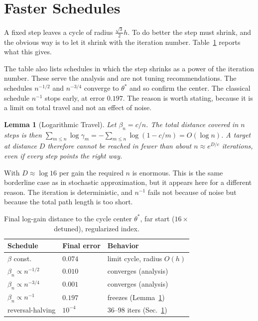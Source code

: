 \documentclass[letterpaper, 10pt, conference, twocolumn]{ieeeconf}
\newtheorem{lemma}{Lemma}
\begin{document}
\section{Faster Schedules}
\label{sec:accel}

A fixed step leaves a cycle of radius $\tfrac{\sqrt3}{2}h$. To do better the
step must shrink, and the obvious way is to let it shrink with the iteration
number. Table~\ref{tab:schedules} reports what this gives.

The table also lists schedules in which the step shrinks as a power of the
iteration number. These serve the analysis and are not tuning recommendations.
The schedules $n^{-1/2}$ and $n^{-3/4}$ converge to $\theta^*$ and so confirm
the center. The classical schedule $n^{-1}$ stops early, at error $0.197$. The
reason is worth stating, because it is a limit on total travel and not an
effect of noise.

\begin{lemma}[Logarithmic Travel]
\label{lem:travel}
Let $\beta_n = c/n$. The total distance covered in $n$ steps is then
$\sum_{m \le n} \log\gamma_m = -\sum_{m \le n}\log(1 - c/m) = O(\log n)$.
A target at distance $D$ therefore cannot be reached in fewer than about
$n \approx e^{D/c}$ iterations, even if every step points the right way.
\end{lemma}

With $D \approx \log 16$ per gain the required $n$ is enormous. This is the
same borderline case as in stochastic approximation, but it appears here for a
different reason. The iteration is deterministic, and $n^{-1}$ fails not
because of noise but because the total path length is too short.

\begin{table}[t]
\small
\centering
\caption{Final log-gain distance to the cycle center $\theta^*$, far start
($16\times$ detuned), regularized index.
}
\label{tab:schedules}
\begin{tabular}{lll}
\toprule
Schedule & Final error & Behavior \\
\midrule
$\beta$ const.           & $0.074$ & limit cycle, radius $O(h)$ \\
$\beta_n \propto n^{-1/2}$ & $0.010$ & converges (analysis) \\
$\beta_n \propto n^{-3/4}$ & $0.001$ & converges (analysis) \\
$\beta_n \propto n^{-1}$   & $0.197$ & freezes (Lemma~\ref{lem:travel}) \\
reversal-halving         & $10^{-4}$ & $36$--$98$ iters (Sec.~\ref{sec:accel}) \\
\bottomrule
\end{tabular}
\end{table}
\end{document}
